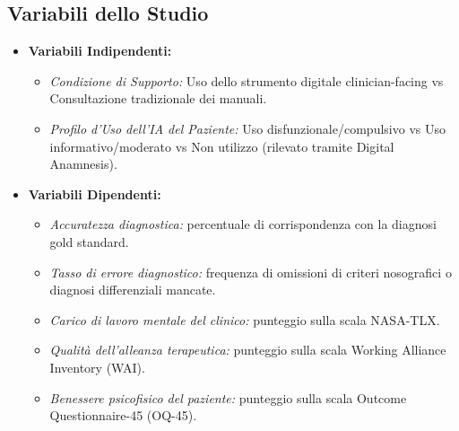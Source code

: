 \documentclass[11pt,a4paper]{article}
\begin{document}
\subsection{Variabili dello Studio}
\begin{itemize}
    \item \textbf{Variabili Indipendenti:}
    \begin{itemize}
        \item \textit{Condizione di Supporto:} Uso dello strumento digitale clinician-facing vs Consultazione tradizionale dei manuali.
        \item \textit{Profilo d'Uso dell'IA del Paziente:} Uso disfunzionale/compulsivo vs Uso informativo/moderato vs Non utilizzo (rilevato tramite Digital Anamnesis).
    \end{itemize}
    \item \textbf{Variabili Dipendenti:}
    \begin{itemize}
        \item \textit{Accuratezza diagnostica:} percentuale di corrispondenza con la diagnosi gold standard.
        \item \textit{Tasso di errore diagnostico:} frequenza di omissioni di criteri nosografici o diagnosi differenziali mancate.
        \item \textit{Carico di lavoro mentale del clinico:} punteggio sulla scala NASA-TLX.
        \item \textit{Qualità dell'alleanza terapeutica:} punteggio sulla scala Working Alliance Inventory (WAI).
        \item \textit{Benessere psicofisico del paziente:} punteggio sulla scala Outcome Questionnaire-45 (OQ-45).
    \end{itemize}
\end{itemize}
\end{document}
